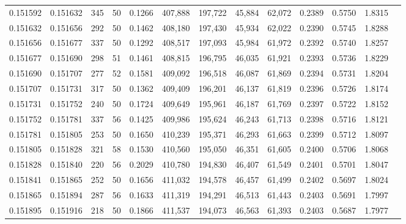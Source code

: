\begin{tabular}{rrrrrrrrrrrrr}
0.151592 & 0.151632 &   345 &  50 &                                     0.1266 & 407,888 & 197,722 &  45,884 &  62,072 & 0.2389 & 0.5750 & 1.8315 \\
0.151632 & 0.151656 &   292 &  50 &                                     0.1462 & 408,180 & 197,430 &  45,934 &  62,022 & 0.2390 & 0.5745 & 1.8288 \\
0.151656 & 0.151677 &   337 &  50 &                                     0.1292 & 408,517 & 197,093 &  45,984 &  61,972 & 0.2392 & 0.5740 & 1.8257 \\
0.151677 & 0.151690 &   298 &  51 &                                     0.1461 & 408,815 & 196,795 &  46,035 &  61,921 & 0.2393 & 0.5736 & 1.8229 \\
0.151690 & 0.151707 &   277 &  52 &                                     0.1581 & 409,092 & 196,518 &  46,087 &  61,869 & 0.2394 & 0.5731 & 1.8204 \\
0.151707 & 0.151731 &   317 &  50 &                                     0.1362 & 409,409 & 196,201 &  46,137 &  61,819 & 0.2396 & 0.5726 & 1.8174 \\
0.151731 & 0.151752 &   240 &  50 &                                     0.1724 & 409,649 & 195,961 &  46,187 &  61,769 & 0.2397 & 0.5722 & 1.8152 \\
0.151752 & 0.151781 &   337 &  56 &                                     0.1425 & 409,986 & 195,624 &  46,243 &  61,713 & 0.2398 & 0.5716 & 1.8121 \\
0.151781 & 0.151805 &   253 &  50 &                                     0.1650 & 410,239 & 195,371 &  46,293 &  61,663 & 0.2399 & 0.5712 & 1.8097 \\
0.151805 & 0.151828 &   321 &  58 &                                     0.1530 & 410,560 & 195,050 &  46,351 &  61,605 & 0.2400 & 0.5706 & 1.8068 \\
0.151828 & 0.151840 &   220 &  56 &                                     0.2029 & 410,780 & 194,830 &  46,407 &  61,549 & 0.2401 & 0.5701 & 1.8047 \\
0.151841 & 0.151865 &   252 &  50 &                                     0.1656 & 411,032 & 194,578 &  46,457 &  61,499 & 0.2402 & 0.5697 & 1.8024 \\
0.151865 & 0.151894 &   287 &  56 &                                     0.1633 & 411,319 & 194,291 &  46,513 &  61,443 & 0.2403 & 0.5691 & 1.7997 \\
0.151895 & 0.151916 &   218 &  50 &                                     0.1866 & 411,537 & 194,073 &  46,563 &  61,393 & 0.2403 & 0.5687 & 1.7977 \\

\end{tabular}
